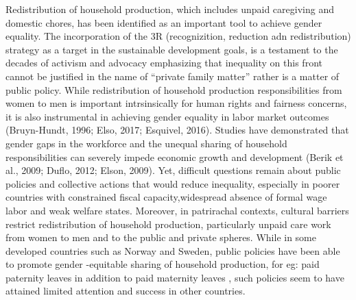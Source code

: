 \documentclass[
  11pt,
]{article}
\begin{document}
Redistribution of household production, which includes unpaid caregiving
and domestic chores, has been identified as an important tool to achieve
gender equality. The incorporation of the 3R (recognizition, reduction
adn redistribution) strategy as a target in the sustainable development
goals, is a testament to the decades of activism and advocacy
emphasizing that inequality on this front cannot be justified in the
name of ``private family matter'' rather is a matter of public policy.
While redistribution of household production responsibilities from women
to men is important intrsinsically for human rights and fairness
concerns, it is also instrumental in achieving gender equality in labor
market outcomes (Bruyn-Hundt, 1996; Elso, 2017; Esquivel, 2016). Studies
have demonstrated that gender gaps in the workforce and the unequal
sharing of household responsibilities can severely impede economic
growth and development (Berik et al., 2009; Duflo, 2012; Elson, 2009).
Yet, difficult questions remain about public policies and collective
actions that would reduce inequality, especially in poorer countries
with constrained fiscal capacity,widespread absence of formal wage labor
and weak welfare states. Moreover, in patrirachal contexts, cultural
barriers restrict redistribution of household production, particularly
unpaid care work from women to men and to the public and private
spheres. While in some developed countries such as Norway and Sweden,
public policies have been able to promote gender -equitable sharing of
household production, for eg: paid paternity leaves in addition to paid
maternity leaves , such policies seem to have attained limited attention
and success in other countries.
\end{document}
